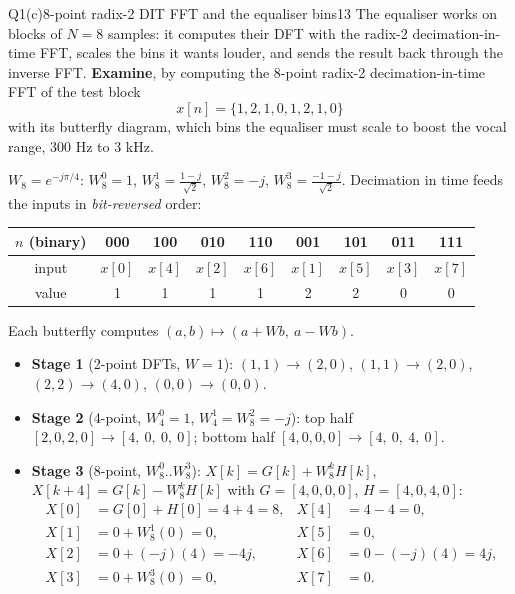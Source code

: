 \begin{qcard}{Q1(c)}{8-point radix-2 DIT FFT and the equaliser bins}{13}
The equaliser works on blocks of $N=8$ samples: it computes their DFT with the radix-2 decimation-in-time FFT, scales the bins it wants louder, and sends the result back through the inverse FFT. \textbf{Examine}, by computing the 8-point radix-2 decimation-in-time FFT of the test block
\[x[n]=\{1,2,1,0,1,2,1,0\}\]
with its butterfly diagram, which bins the equaliser must scale to boost the vocal range, 300 Hz to 3 kHz.
\end{qcard}
\begin{solution}
 $W_8=e^{-j\pi/4}$: $W_8^0=1$, $W_8^1=\frac{1-j}{\sqrt2}$, $W_8^2=-j$, $W_8^3=\frac{-1-j}{\sqrt2}$. Decimation in time feeds the inputs in \emph{bit-reversed} order:
\begin{center}\small\begin{tabular}{@{}c|cccccccc@{}}
$n$ (binary)&000&100&010&110&001&101&011&111\\\hline
input&$x[0]$&$x[4]$&$x[2]$&$x[6]$&$x[1]$&$x[5]$&$x[3]$&$x[7]$\\
value&1&1&1&1&2&2&0&0\end{tabular}\end{center}

 Each butterfly computes $(a,b)\mapsto(a+W b,\ a-W b)$.
\begin{itemize}[leftmargin=1.4em,itemsep=2pt]
\item \textbf{Stage 1} (2-point DFTs, $W=1$): $(1,1)\to(2,0)$, $(1,1)\to(2,0)$, $(2,2)\to(4,0)$, $(0,0)\to(0,0)$.
\item \textbf{Stage 2} (4-point, $W_4^0=1$, $W_4^1=W_8^2=-j$): top half $[2,0,2,0]\to[4,\ 0,\ 0,\ 0]$; bottom half $[4,0,0,0]\to[4,\ 0,\ 4,\ 0]$.
\item \textbf{Stage 3} (8-point, $W_8^0..W_8^3$): $X[k]=G[k]+W_8^kH[k]$, $X[k+4]=G[k]-W_8^kH[k]$ with $G=[4,0,0,0]$, $H=[4,0,4,0]$:
\begin{align*}
X[0]&=G[0]+H[0]=4+4=8, & X[4]&=4-4=0,\\
X[1]&=0+W_8^1(0)=0, & X[5]&=0,\\
X[2]&=0+(-j)(4)=-4j, & X[6]&=0-(-j)(4)=4j,\\
X[3]&=0+W_8^3(0)=0, & X[7]&=0.
\end{align*}
\end{itemize}


\end{solution}
